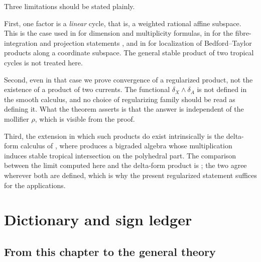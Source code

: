 \begin{remark}
\label{rem:ch11-intersection-scope}
Three limitations should be stated plainly.

First, one factor is a \emph{linear} cycle, that is, a weighted rational
affine subspace.  This is the case used in
 for dimension and multiplicity
formulas, in  for the fibre-integration and
projection statements
, and in
 for localization of Bedford--Taylor products
along a coordinate subspace.  The general stable product of two tropical
cycles is not treated here.

Second, even in that case we prove convergence of a regularized product,
not the existence of a product of two currents.  The functional
$\delta_X\wedge\delta_A$ is not defined in the smooth calculus, and no
choice of regularizing family should be read as defining it.  What the
theorem asserts is that the answer is independent of the mollifier $\rho$,
which is visible from the proof.

Third, the extension in which such products do exist intrinsically is the
delta-form calculus of , where
 produces a bigraded algebra whose
multiplication induces stable tropical intersection on the polyhedral part.
The comparison between the limit computed here and the delta-form product
is ; the two agree wherever both are defined,
which is why the present regularized statement suffices for the
applications.
\end{remark}

\section{Dictionary and sign ledger}
\label{sec:ch11-ledger}

\subsection{From this chapter to the general theory}
\label{sec:ch11-dict-forward}

